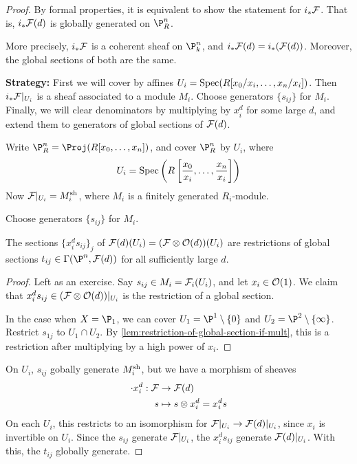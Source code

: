 \documentclass{article}
\begin{document}
\begin{proof}
    By formal properties, it is equivalent to show the statement for \(i_*\mathcal{F}\). That is, \(i_*\mathcal{F}(d)\) is globally generated on \(\P^n_R\). \begin{addendum}
        More precisely, \(i_*\mathcal{F}\) is a coherent sheaf on \(\P^n_k\), and \(i_*\mathcal{F}(d) = i_*(\mathcal{F}(d))\). Moreover, the global sections of both are the same.
    \end{addendum}

    \textbf{Strategy:} First we will cover by affines \(U_i = \operatorname{Spec}(R[x_0/x_i, \dots, x_n/x_i])\). Then \(i_*\mathcal{F}\vert_{U_i}\) is a sheaf associated to a module \(M_i\). Choose generators \(\{s_{ij}\}\) for \(M_i\). Finally, we will clear denominators by multiplying by \(x_i^d\) for some large \(d\), and extend them to generators of global sections of \(\mathcal{F}(d)\).

\lec

    Write \(\P^n_R = \Proj(R[x_0, \dots, x_n])\), and cover \(\P^n_R\) by \(U_i\), where
    \[U_i = \operatorname{Spec}\left(R\left[\frac{x_0}{x_i}, \dots, \frac{x_n}{x_i}\right]\right)\]
    Now \(\mathcal{F}\vert_{U_i} = M_i^{\operatorname{sh}}\), where \(M_i\) is a finitely generated \(R_i\)-module.

    Choose generators \(\{s_{ij}\}\) for \(M_i\).

    \begin{claim}
        The sections \(\{x_i^ds_{ij}\}_{j}\) of \(\mathcal{F}(d)(U_i) = (\mathcal{F} \otimes \mathcal{O}(d))(U_i)\) are restrictions of global sections \(t_{ij} \in \Gamma(\P^n, \mcF(d))\) for all sufficiently large \(d\).
    \end{claim}

    \begin{proof}
        Left as an exercise. Say \(s_{ij} \in M_i = \mathcal{F}_i(U_i)\), and let \(x_i \in \mathcal{O}(1)\). We claim that \(x_i^ds_{ij} \in (\mathcal{F}\otimes \mathcal{O}(d))\vert_{U_i}\) is the restriction of a global section.

        In the case when \(X = \P_1\), we can cover \(U_1 = \P^1\setminus \{0\}\) and \(U_2 = \P^2 \setminus \{\infty\}\). Restrict \(s_{1j}\) to \(U_1 \cap U_2\). By \cref{lem:restriction-of-global-section-if-mult}, this is a restriction after multiplying by a high power of \(x_i\).
    \end{proof}

    On \(U_i\), \(s_{ij}\) gobally generate \(M_i^{\operatorname{sh}}\), but we have a morphism of sheaves
    \begin{align*}
        \cdot x_i^d : \mathcal{F} &\to \mathcal{F}(d) \\
        s &\mapsto s \otimes x_i^d = x_i^d s 
    \end{align*}
    On each \(U_i\), this restricts to an isomorphism for \(\mathcal{F}\vert_{U_i} \to \mathcal{F}(d)\vert_{U_i}\), since \(x_i\) is invertible on \(U_i\). Since the \(s_{ij}\) generate \(\mathcal{F}\vert_{U_i}\), the \(x_i^ds_{ij}\) generate \(\mathcal{F}(d)\vert_{U_i}\). With this, the \(t_{ij}\) globally generate.
\end{proof}
\end{document}
